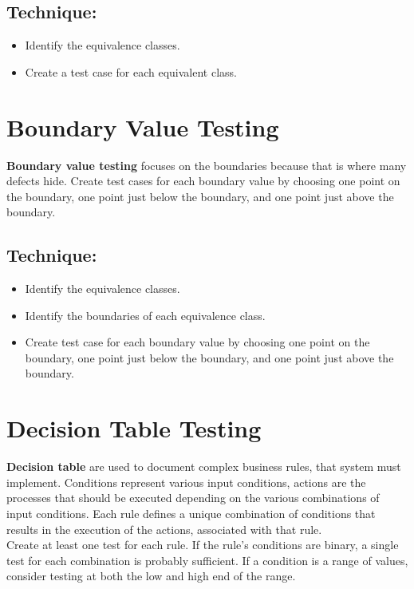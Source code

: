 \documentclass{article}
\begin{document}
\subsection*{Technique:}
\begin{itemize}
\item Identify the equivalence classes.
\item Create a test case for each equivalent class.
\end{itemize}

\section*{Boundary Value Testing}
\textbf{Boundary value testing} focuses on the boundaries because that is where many defects hide. Create test cases for each boundary value by choosing one point on the boundary, one point just below the boundary, and one point just above the boundary.
\subsection*{Technique:}
\begin{itemize}
\item Identify the equivalence classes.
\item Identify the boundaries of each equivalence class.
\item Create test case for each boundary value by choosing one point on the boundary, one point just below the boundary, and one point just above the boundary.
\end{itemize}

\section*{Decision Table Testing}
\textbf{Decision table} are used to document complex business rules, that system must implement. Conditions represent various input conditions, actions are the processes that should be executed depending on the various combinations of input conditions. Each rule defines a unique combination of conditions that results in the execution of the actions, associated with that rule. 
\\
Create at least one test for each rule. If the rule's conditions are binary, a single test for each combination is probably sufficient. If a condition is a range of values, consider testing at both the low and high end of the range.
\end{document}
